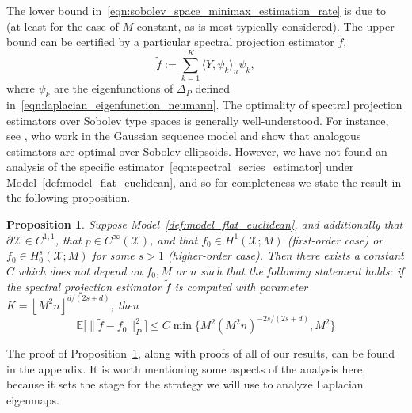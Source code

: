 \documentclass{article}
\newcommand{\floor}[1]{\left\lfloor #1 \right\rfloor}
\newcommand{\1}{\mathbf{1}}
\newcommand{\mc}[1]{\mathcal{#1}}
\newcommand{\Ebb}{\mathbb{E}}
\newcommand{\dotp}[2]{\langle #1, #2 \rangle}
\newcommand{\wt}[1]{\widetilde{#1}}
\theoremstyle{alden}
\theoremstyle{aldenthm}
\newtheorem{proposition}{Proposition}
\theoremstyle{definition}
\theoremstyle{remark}
\begin{document}
The lower bound in~\eqref{eqn:sobolev_space_minimax_estimation_rate} is due to~\citep{stone1980} (at least for the case of $M$ constant, as is most typically considered). The upper bound can be certified by a particular spectral projection estimator $\wt{f}$,
\begin{equation}
\label{eqn:spectral_series_estimator}
\wt{f} := \sum_{k = 1}^{K} \dotp{Y}{\psi_k}_n \psi_k,
\end{equation}
where $\psi_k$ are the eigenfunctions of $\Delta_P$ defined in~\eqref{eqn:laplacian_eigenfunction_neumann}. The optimality of spectral projection estimators over Sobolev type spaces is generally well-understood. For instance, see \cite{tsybakov08,johnstone2011,gine16}, who work in the Gaussian sequence model and show that analogous estimators are optimal over Sobolev ellipsoids. However, we have not found an analysis of the specific estimator~\eqref{eqn:spectral_series_estimator} under Model~\ref{def:model_flat_euclidean}, and so for completeness we state the result in the following proposition.
\begin{proposition}
	\label{prop:spectral_series_estimation}
	Suppose Model~\ref{def:model_flat_euclidean}, and additionally that $\partial \mc{X} \in C^{1,1}$, that $p \in C^{\infty}(\mc{X})$, and that $f_0 \in H^1(\mc{X};M)$ (first-order case) or $f_0 \in H_0^s(\mc{X};M)$ for some $s > 1$ (higher-order case). Then there exists a constant $C$ which does not depend on $f_0,M$ or $n$ such that the following statement holds: if the spectral projection estimator $\wt{f}$ is computed with parameter $K = \floor{M^2n}^{d/(2s + d)}$, then
	\begin{equation*}
	\Ebb\bigl[\|\wt{f} - f_0\|_P^2\bigr] \leq C \min\bigl\{M^2(M^2n)^{-2s/(2s + d)}, M^2\bigr\}
	\end{equation*}
\end{proposition}
The proof of Proposition~\ref{prop:spectral_series_estimation}, along with proofs of all of our results, can be found in the appendix. It is worth mentioning some aspects of the analysis here, because it sets the stage for the strategy we will use to analyze Laplacian eigenmaps.  
\end{document}
